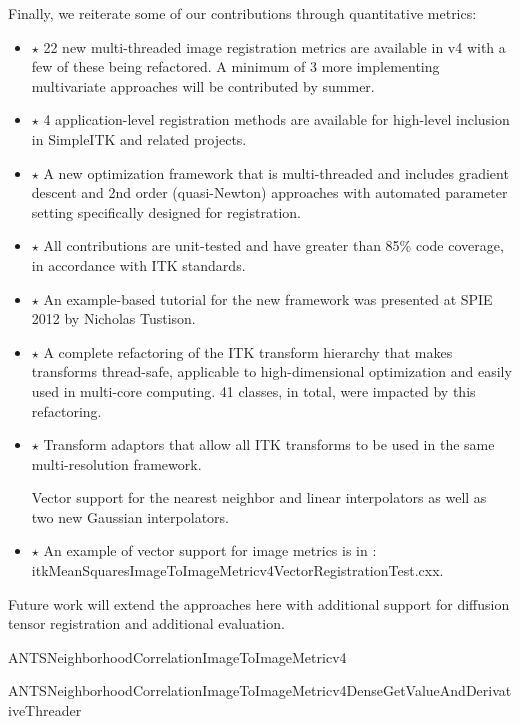 \documentclass{frontiersSCNS}
\begin{document}
Finally, we reiterate some of our contributions through quantitative metrics:
\begin{itemize}
\item $\star$ 22 new multi-threaded image registration metrics are available in v4 with a few of these being refactored. A minimum of 3 more implementing multivariate approaches will be contributed by summer.

\item $\star$ 4 application-level registration methods are available for high-level inclusion in SimpleITK and related projects.

\item $\star$ A new optimization framework that is multi-threaded and includes gradient descent and 2nd order (quasi-Newton) approaches with automated parameter setting specifically designed for registration.

\item $\star$ All contributions are unit-tested and have greater than 85\% code coverage, in accordance with ITK standards.

\item $\star$ An example-based tutorial for the new framework was presented at SPIE 2012 by Nicholas Tustison.

\item $\star$ A complete refactoring of the ITK transform hierarchy that makes transforms thread-safe, applicable to high-dimensional optimization and easily used in multi-core computing. 41 classes, in total, were impacted by this refactoring.

\item $\star$ Transform adaptors that allow all ITK transforms to be used in the same multi-resolution framework. 

Vector support for the nearest neighbor and linear interpolators as well as two new Gaussian interpolators.

\item $\star$ An example of vector support for image metrics is in : itkMeanSquaresImageToImageMetricv4VectorRegistrationTest.cxx.
\end{itemize}

Future work will extend the approaches here with additional support
for diffusion tensor registration and additional evaluation.



ANTSNeighborhoodCorrelationImageToImageMetricv4

ANTSNeighborhoodCorrelationImageToImageMetricv4DenseGetValueAndDerivativeThreader
\end{document}
